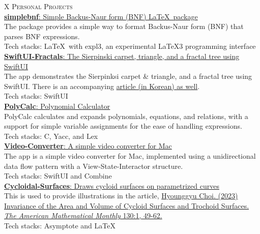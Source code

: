 \documentclass[a4paper,10pt]{memoir}
\begin{document}
\begin{tblr}{X}
  {\Large\textsc{Personal Projects}} \\ \hline
  \href{https://github.com/Zeta611/simplebnf}{\textbf{simplebnf}: Simple Backus-Naur form (BNF) \LaTeX\ package} \\
  The package provides a simple way to format Backus-Naur form (BNF) that parses BNF expressions.\\
  Tech stacks: \LaTeX\ with \textsf{expl3}, an experimental \LaTeX3 programming interface\\[0.5\onelineskip]

  \href{https://github.com/Zeta611/SwiftUI-Fractals}{\textbf{SwiftUI-Fractals}: The Sierpinski carpet, triangle, and a fractal tree using SwiftUI}\\
  The app demonstrates the Sierpinksi carpet \& triangle, and a fractal tree using SwiftUI. There is an accompanying \href{https://zetablog.io/posts/fractals-in-swiftui}{article (in Korean) as well}.\\
  Tech stacks: SwiftUI\\[0.5\onelineskip]

  \href{https://github.com/Zeta611/polycalc}{\textbf{PolyCalc}: Polynomial Calculator}\\
  PolyCalc calculates and expands polynomials, equations, and relations, with a support for simple variable assignments for the ease of handling expressions.\\
  Tech stacks: C, Yacc, and Lex\\[0.5\onelineskip]

  \href{https://github.com/Zeta611/Video-Converter}{\textbf{Video-Converter}: A simple video converter for Mac}\\
  The app is a simple video converter for Mac, implemented using a unidirectional data flow pattern with a View-State-Interactor structure.\\
  Tech stacks: SwiftUI and Combine\\[0.5\onelineskip]

  \href{https://github.com/Zeta611/cycloidal-surfaces}{\textbf{Cycloidal-Surfaces}: Draws cycloid surfaces on parametrized curves}\\
  This is used to provide illustrations in the article, \href{http://lps3.doi.org.libproxy.snu.ac.kr/10.1080/00029890.2022.2130677}{Hyounggyu Choi. (2023) Invariance of the Area and Volume of Cycloid Surfaces and Trochoid Surfaces. \textit{The American Mathematical Monthly} 130:1, 49-62.}\\
  Tech stacks: Asymptote and \LaTeX \\[0.5\onelineskip]


\end{tblr}
\end{document}

